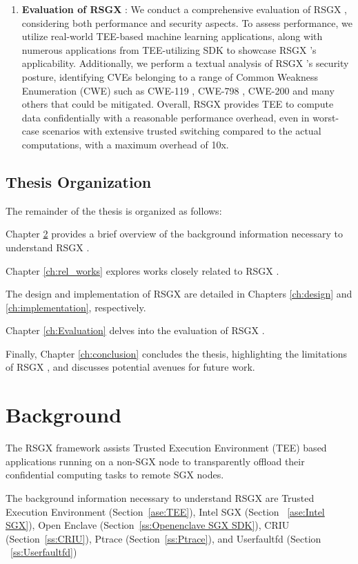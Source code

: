 \documentclass[article, doublespace,nopageskip]{VTthesis} %
\newcommand{\monitor}{RSGX \xspace}
\begin{document}
\begin{enumerate}
        \item \textbf{Evaluation of \monitor}: We conduct a comprehensive evaluation of \monitor, considering both performance and security aspects. To assess performance, we utilize real-world TEE-based machine learning applications, along with numerous applications from TEE-utilizing SDK to showcase \monitor's applicability. Additionally, we perform a textual analysis of \monitor's security posture, identifying CVEs belonging to a range of Common Weakness Enumeration (CWE) such as CWE-119 \cite{CWE-119}, CWE-798 \cite{CWE-798}, CWE-200 \cite{CWE-200} and many others that could be mitigated. Overall, \monitor provides TEE to compute data confidentially with a reasonable performance overhead, even in worst-case scenarios with extensive trusted switching compared to the actual computations, with a maximum overhead of 10x.
    \end{enumerate}

    \section{Thesis Organization}
    The remainder of the thesis is organized as follows:

    Chapter \ref{ch:Background} provides a brief overview of the background information necessary to understand \monitor.
    
    Chapter \ref{ch:rel_works} explores works closely related to \monitor.
    
    The design and implementation of \monitor are detailed in Chapters \ref{ch:design} and \ref{ch:implementation}, respectively.
    
    Chapter \ref{ch:Evaluation} delves into the evaluation of \monitor.
    
    Finally, Chapter \ref{ch:conclusion} concludes the thesis, highlighting the limitations of \monitor, and discusses potential avenues for future work.
    
    

    \chapter{Background} \label{ch:Background}
    The \monitor framework assists Trusted Execution Environment (TEE) based applications running on a non-SGX node to transparently offload their confidential computing tasks to remote SGX nodes. \

    The background information necessary to understand \monitor are Trusted Execution Environment (Section~\ref{ase:TEE}), Intel SGX (Section ~\ref{ase:Intel SGX}), Open Enclave (Section~\ref{ss:Openenclave SGX SDK}), CRIU (Section~\ref{ss:CRIU}), Ptrace (Section~\ref{ss:Ptrace}), and Userfaultfd (Section ~\ref{ss:Userfaultfd})
\end{document}
